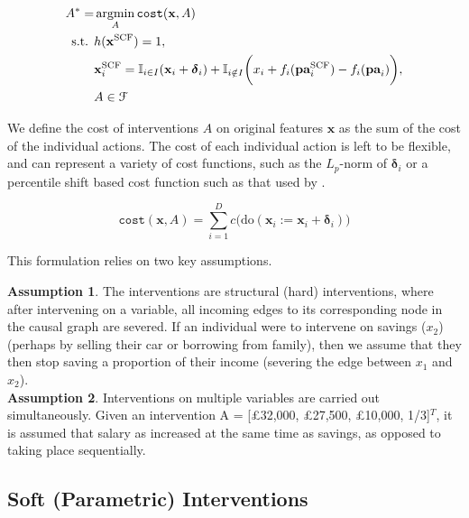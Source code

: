 \begin{align} \label{eq:causal_recourse_problem_hard}
	A^* = & \operatorname*{argmin}_{A} \texttt{cost}(\mathbf{x}, A) \\ \nonumber
	\text{s.t. } & h(\mathbf{x}^{\text{SCF}}) = 1, \\ \nonumber
	& \mathbf{x}^{\text{SCF}}_i = \mathbb{I}_{i \in I} (\mathbf{x}_i + \boldsymbol{\delta}_i) + \mathbb{I}_{i \notin I} \bigg(x_i + f_i(\textbf{pa}^{\text{SCF}}_i) - f_i(\textbf{pa}_i)\bigg), \\ \nonumber
	& A \in \mathcal{F}
\end{align}

We define the cost of interventions $A$ on original features $\mathbf{x}$ as the sum of the cost of the individual actions. The cost of each individual action is left to be flexible, and can represent a variety of cost functions, such as the $L_p$-norm of $\boldsymbol{\delta}_i$ or a percentile shift based cost function such as that used by \textcite{ustunActionableRecourseLinear2019}.

\begin{equation}
	\texttt{cost}(\mathbf{x}, A) = \sum_{i=1}^{D} c \bigg(\text{do}(\mathbf{x}_i:=\mathbf{x}_i + \boldsymbol{\delta}_i) \bigg)
\end{equation}

This formulation relies on two key assumptions.

\textbf{Assumption 1}. The interventions are structural (hard) interventions, where after intervening on a variable, all incoming edges to its corresponding node in the causal graph are severed. If an individual were to intervene on savings ($x_2$) (perhaps by selling their car or borrowing from family), then we assume that they then stop saving a proportion of their income (severing the edge between $x_1$ and $x_2$).\\

\textbf{Assumption 2}. Interventions on multiple variables are carried out simultaneously. Given an intervention A = [£32,000, £27,500, £10,000, 1/3]$^T$, it is assumed that salary as increased at the same time as savings, as opposed to taking place sequentially.

\subsection{Soft (Parametric) Interventions} \label{section:soft_interventions}

